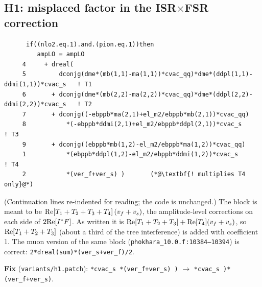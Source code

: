 \documentclass[11pt,a4paper]{article}
\newcommand{\code}[1]{\texttt{#1}}
\begin{document}
\subsection{\texorpdfstring{H1: misplaced factor in the ISR$\times$FSR correction}{H1: misplaced factor in the ISR x FSR correction}}
\label{sec:h1}
\begin{lstlisting}
      if((nlo2.eq.1).and.(pion.eq.1))then
         ampLO = ampLO
     4     + dreal(
     5         dconjg(dme*(mb(1,1)-ma(1,1))*cvac_qq)*dme*(ddpl(1,1)-ddmi(1,1))*cvac_s   ! T1
     6       + dconjg(dme*(mb(2,2)-ma(2,2))*cvac_qq)*dme*(ddpl(2,2)-ddmi(2,2))*cvac_s   ! T2
     7       + dconjg((-ebppb*ma(2,1)+el_m2/ebppb*mb(2,1))*cvac_qq)
     8           *(-ebppb*ddmi(2,1)+el_m2/ebppb*ddpl(2,1))*cvac_s                       ! T3
     9       + dconjg((ebppb*mb(1,2)-el_m2/ebppb*ma(1,2))*cvac_qq)
     1           *(ebppb*ddpl(1,2)-el_m2/ebppb*ddmi(1,2))*cvac_s                        ! T4
     2           *(ver_f+ver_s) )       (*@\textbf{! multiplies T4 only}@*)
\end{lstlisting}
(Continuation lines re-indented for reading; the code is unchanged.)
The block is meant to be ${\rm Re}[T_1+T_2+T_3+T_4]\,(v_f+v_s)$, the amplitude-level corrections on
each side of $2{\rm Re}[I^*F]$. As written it is
${\rm Re}[T_1+T_2+T_3]+{\rm Re}[T_4](v_f+v_s)$, so ${\rm Re}[T_1+T_2+T_3]$ (about a third of the
tree interference) is added with coefficient 1. The muon version of the same block
(\code{phokhara\_10.0.f:10384--10394}) is correct:
\code{2*dreal(sum)*(ver\_s+ver\_f)/2}.

\textbf{Fix} (\code{variants/h1.patch}): \code{*cvac\_s *(ver\_f+ver\_s) )} $\to$
\code{*cvac\_s )*(ver\_f+ver\_s)}.
\end{document}

